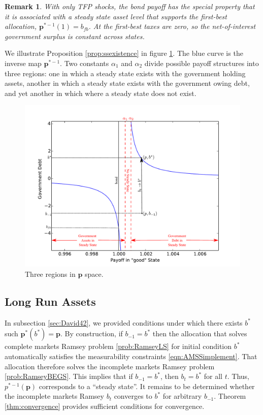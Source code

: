 \documentclass[12pt]{article}
\newtheorem{remark}[theorem]{Remark}
\begin{document}
\begin{remark}
		With only TFP shocks, the bond payoff has the special property that it is associated with a steady state asset level that supports the first-best allocation, $\bm p^{* -1}(1) = b_{fb}$.  At the first-best taxes are zero, so the net-of-interest government surplus is constant across states.
		\end{remark}
		We illustrate Proposition \ref{prop:ssexistence} in figure \ref{fig:noStable}.  The  blue curve is the inverse map $\bm p^{*-1}$.  Two constants $\alpha_1$ and $\alpha_2$ divide  possible payoff structures into three regions: one in which a steady state exists with the government holding assets,
another in which  a steady state exists with the government owing debt, and yet another in which  where a steady state does not exist.
		\begin{figure}[ht]
		\begin{center}
		\includegraphics[width=5.5in]{Images/graph_nostable.pdf}
\caption{Three regions in $\bm{p}$ space.\label{fig:noStable}}
	\end{center}
	\end{figure}
\subsection{Long Run Assets} \label{sec:David43}
In subsection \ref{sec:David42},  we provided conditions under which there exists $b^*$ such $\bm p^*(b^*) = \bm p$.  By construction, if $b_{-1} = b^*$ then the allocation that solves complete markets Ramsey problem \ref{prob:RamseyLS} for initial condition $b^*$  automatically satisfies the measurability constraints \eqref{eqn:AMSSimplement}.  That allocation therefore solves the incomplete markets Ramsey problem \ref{prob:RamseyBEGS}.  This implies that if $b_{-1} = b^*$, then $b_t = b^*$ for all $t$.  Thus, $p^{*-1}(\bm p)$ corresponds to a ``steady state''.  It remains to be determined whether  the incomplete markets Ramsey $b_t$  converges to  $b^*$  for arbitrary $b_{-1}$.  Theorem \ref{thm:convergence} provides sufficient conditions for  convergence.
\end{document}
